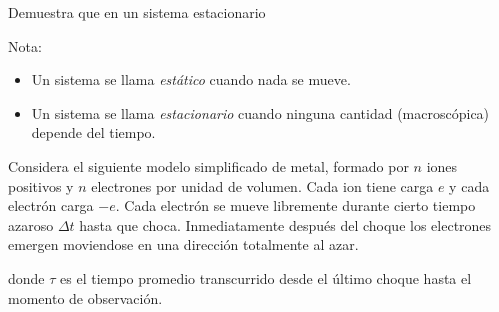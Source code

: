 \documentclass{exam}
\begin{document}
\begin{questions}
  \question Demuestra que en un sistema estacionario
    Nota:
    \begin{itemize}
    \item Un sistema se llama {\em estático} cuando nada se mueve.
    \item Un sistema se llama {\em estacionario} cuando ninguna
      cantidad (macroscópica) depende del tiempo.
    \end{itemize}

  \question Considera el siguiente modelo simplificado de metal,
    formado por $n$ iones positivos y $n$ electrones por unidad de
    volumen. Cada ion tiene carga $e$ y cada electrón carga $-e$. Cada
    electrón se mueve libremente durante cierto tiempo azaroso $\Delta
    t$ hasta que choca. Inmediatamente después del choque los
    electrones emergen moviendose en una dirección totalmente al
    azar.
    donde $\tau$ es el tiempo promedio transcurrido desde el último
    choque hasta el momento de observación.


\end{questions}
\end{document}
